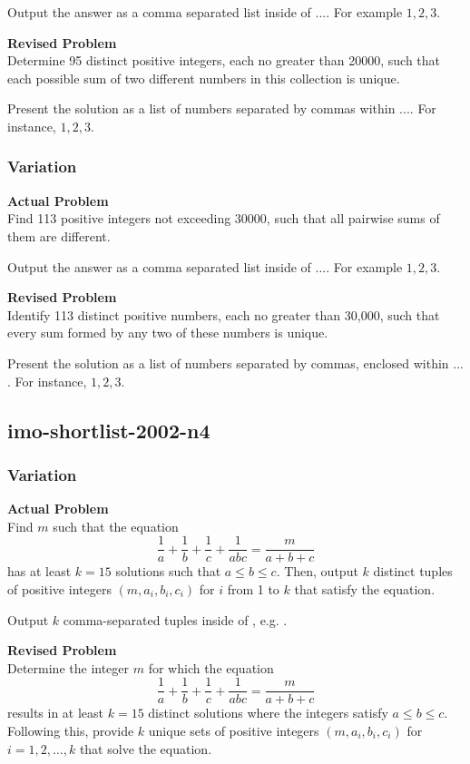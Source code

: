 Output the answer as a comma separated list inside of $\boxed{...}$. For example $\boxed{1, 2, 3}$.

\textbf{Revised Problem}\\
Determine 95 distinct positive integers, each no greater than 20000, such that each possible sum of two different numbers in this collection is unique.

Present the solution as a list of numbers separated by commas within $\boxed{...}$. For instance, $\boxed{1, 2, 3}$.

\subsubsection{Variation}
\textbf{Actual Problem}\\
Find 113 positive integers not exceeding 30000, such that all pairwise sums of them are different.

Output the answer as a comma separated list inside of $\boxed{...}$. For example $\boxed{1, 2, 3}$.

\textbf{Revised Problem}\\
Identify 113 distinct positive numbers, each no greater than 30,000, such that every sum formed by any two of these numbers is unique.

Present the solution as a list of numbers separated by commas, enclosed within $\boxed{...}$. For instance, $\boxed{1, 2, 3}$.

\subsection{imo-shortlist-2002-n4}
\subsubsection{Variation}
\textbf{Actual Problem}\\
Find $m$ such that the equation
$$
\frac{1}{a} + \frac{1}{b} + \frac{1}{c} + \frac{1}{abc} = \frac{m}{a + b + c}
$$
has at least $k = 15$ solutions such that $a \leq b \leq c$.
Then, output $k$ distinct tuples of positive integers $(m, a_i, b_i, c_i)$ for $i$ from 1 to $k$ that satisfy the equation.


Output $k$ comma-separated tuples inside of \boxed{}, e.g. .

\textbf{Revised Problem}\\
Determine the integer \( m \) for which the equation
$$
\frac{1}{a} + \frac{1}{b} + \frac{1}{c} + \frac{1}{abc} = \frac{m}{a + b + c}
$$
results in at least \( k = 15 \) distinct solutions where the integers satisfy \( a \leq b \leq c \).
Following this, provide \( k \) unique sets of positive integers \( (m, a_i, b_i, c_i) \) for \( i = 1, 2, \ldots, k \) that solve the equation.

